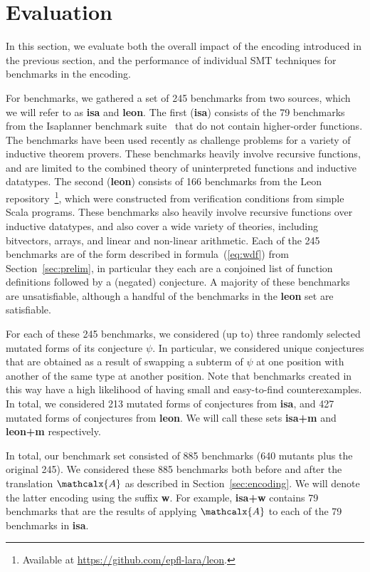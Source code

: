 \documentclass[runningheads,a4paper]{llncs}
\newcommand{\conv}{\mathcalx{A}}
\begin{document}
\section{Evaluation}
\label{sec:evaluation}

In this section, we evaluate both
the overall impact of the encoding introduced in the previous section, and
the performance of individual SMT techniques for benchmarks in the encoding.

For benchmarks, we gathered a set of 245 benchmarks from two sources, which we will refer to as {\bf isa} and {\bf leon}.
The first ({\bf isa}) consists of the 79 benchmarks from the Isaplanner benchmark suite~\cite{DBLP:conf/itp/JohanssonDB10} that do not contain higher-order functions.
The benchmarks have been used recently as challenge problems for a variety of inductive theorem provers.
These benchmarks heavily involve recursive functions, and are limited to the combined theory of uninterpreted functions and inductive datatypes.
The second ({\bf leon}) consists of 166 benchmarks from the Leon repository~\footnote{Available at \url{https://github.com/epfl-lara/leon}.},
which were constructed from verification conditions from simple Scala programs.
These benchmarks also heavily involve recursive functions over inductive datatypes,
and also cover a wide variety of theories, including bitvectors, arrays, and linear and non-linear arithmetic.
Each of the 245 benchmarks are of the form described in formula~(\ref{eq:wdf}) from Section~\ref{sec:prelim},
in particular they each are a conjoined list of function definitions followed by a (negated) conjecture.
A majority of these benchmarks are unsatisfiable, although a handful of the benchmarks in the {\bf leon} set are satisfiable.

For each of these 245 benchmarks, we considered (up to) three randomly selected mutated forms of its conjecture $\psi$.
In particular, we considered unique conjectures that are obtained as a result of swapping a subterm of $\psi$ at one position
with another of the same type at another position.
Note that benchmarks created in this way have a high likelihood of having small and easy-to-find counterexamples.
In total, we considered 213 mutated forms of conjectures from {\bf isa}, and 427 mutated forms of conjectures from {\bf leon}.
We will call these sets {\bf isa+m} and {\bf leon+m} respectively.

In total, our benchmark set consisted of 885 benchmarks (640 mutants plus the original 245).
We considered these 885 benchmarks both before and after the translation $\conv$ as described in Section~\ref{sec:encoding}.
We will denote the latter encoding using the suffix {\bf w}.
For example, {\bf isa+w} contains 79 benchmarks that are the results of
applying $\conv$ to each of the 79 benchmarks in {\bf isa}.
\end{document}
